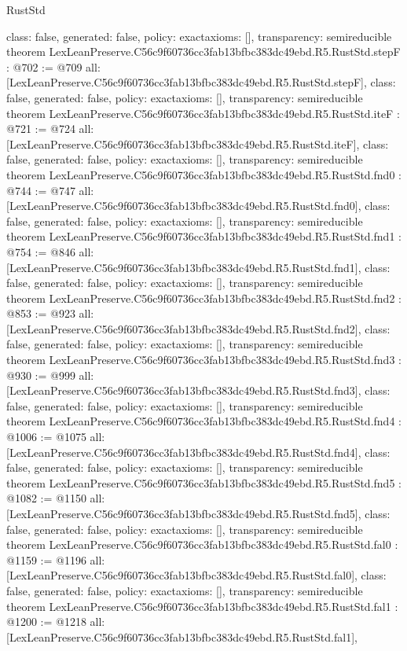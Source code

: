 \begin{lexlean}{RustStd}
\begin{coremodule}
{  class: false,
  generated: false,
  policy: exact{axioms: []},
  transparency: semireducible
}
theorem LexLeanPreserve.C56c9f60736cc3fab13bfbc383dc49ebd.R5.RustStd.stepF : @702 := @709 {
  all: [LexLeanPreserve.C56c9f60736cc3fab13bfbc383dc49ebd.R5.RustStd.stepF],
  class: false,
  generated: false,
  policy: exact{axioms: []},
  transparency: semireducible
}
theorem LexLeanPreserve.C56c9f60736cc3fab13bfbc383dc49ebd.R5.RustStd.iteF : @721 := @724 {
  all: [LexLeanPreserve.C56c9f60736cc3fab13bfbc383dc49ebd.R5.RustStd.iteF],
  class: false,
  generated: false,
  policy: exact{axioms: []},
  transparency: semireducible
}
theorem LexLeanPreserve.C56c9f60736cc3fab13bfbc383dc49ebd.R5.RustStd.fnd0 : @744 := @747 {
  all: [LexLeanPreserve.C56c9f60736cc3fab13bfbc383dc49ebd.R5.RustStd.fnd0],
  class: false,
  generated: false,
  policy: exact{axioms: []},
  transparency: semireducible
}
theorem LexLeanPreserve.C56c9f60736cc3fab13bfbc383dc49ebd.R5.RustStd.fnd1 : @754 := @846 {
  all: [LexLeanPreserve.C56c9f60736cc3fab13bfbc383dc49ebd.R5.RustStd.fnd1],
  class: false,
  generated: false,
  policy: exact{axioms: []},
  transparency: semireducible
}
theorem LexLeanPreserve.C56c9f60736cc3fab13bfbc383dc49ebd.R5.RustStd.fnd2 : @853 := @923 {
  all: [LexLeanPreserve.C56c9f60736cc3fab13bfbc383dc49ebd.R5.RustStd.fnd2],
  class: false,
  generated: false,
  policy: exact{axioms: []},
  transparency: semireducible
}
theorem LexLeanPreserve.C56c9f60736cc3fab13bfbc383dc49ebd.R5.RustStd.fnd3 : @930 := @999 {
  all: [LexLeanPreserve.C56c9f60736cc3fab13bfbc383dc49ebd.R5.RustStd.fnd3],
  class: false,
  generated: false,
  policy: exact{axioms: []},
  transparency: semireducible
}
theorem LexLeanPreserve.C56c9f60736cc3fab13bfbc383dc49ebd.R5.RustStd.fnd4 : @1006 := @1075 {
  all: [LexLeanPreserve.C56c9f60736cc3fab13bfbc383dc49ebd.R5.RustStd.fnd4],
  class: false,
  generated: false,
  policy: exact{axioms: []},
  transparency: semireducible
}
theorem LexLeanPreserve.C56c9f60736cc3fab13bfbc383dc49ebd.R5.RustStd.fnd5 : @1082 := @1150 {
  all: [LexLeanPreserve.C56c9f60736cc3fab13bfbc383dc49ebd.R5.RustStd.fnd5],
  class: false,
  generated: false,
  policy: exact{axioms: []},
  transparency: semireducible
}
theorem LexLeanPreserve.C56c9f60736cc3fab13bfbc383dc49ebd.R5.RustStd.fal0 : @1159 := @1196 {
  all: [LexLeanPreserve.C56c9f60736cc3fab13bfbc383dc49ebd.R5.RustStd.fal0],
  class: false,
  generated: false,
  policy: exact{axioms: []},
  transparency: semireducible
}
theorem LexLeanPreserve.C56c9f60736cc3fab13bfbc383dc49ebd.R5.RustStd.fal1 : @1200 := @1218 {
  all: [LexLeanPreserve.C56c9f60736cc3fab13bfbc383dc49ebd.R5.RustStd.fal1],
}
\end{coremodule}
\end{lexlean}
